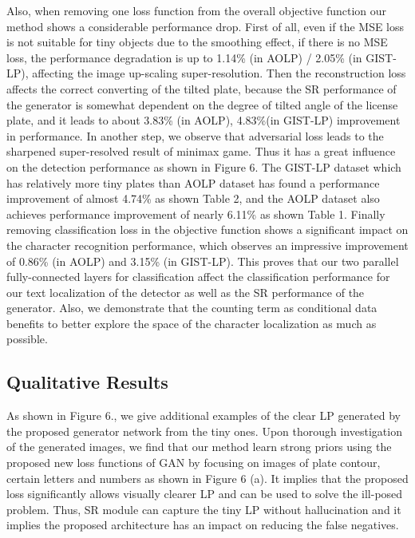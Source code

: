 \documentclass[a4paper,twoside]{article}
\begin{document}
    Also, when removing one loss function from the overall objective function our method shows a considerable performance drop. First of all, even if the MSE loss is not suitable for tiny objects due to the smoothing effect, if there is no MSE loss, the performance degradation is up to 1.14\% (in AOLP) / 2.05\% (in GIST-LP), affecting the image up-scaling super-resolution. Then the reconstruction loss affects the correct converting of the tilted plate, because the SR performance of the generator is somewhat dependent on the degree of tilted angle of the license plate, and it leads to about 3.83\% (in AOLP), 4.83\%(in GIST-LP) improvement in performance. In another step, we observe that adversarial loss leads to the sharpened super-resolved result of minimax game. Thus it has a great influence on the detection performance as shown in Figure 6. The GIST-LP dataset which has relatively more tiny plates than AOLP dataset has found a performance improvement of almost 4.74\% as shown Table 2, and the AOLP dataset also achieves performance improvement of nearly 6.11\% as shown Table 1. Finally removing classification loss in the objective function shows a significant impact on the character recognition performance, which observes an impressive improvement of 0.86\% (in AOLP) and 3.15\% (in GIST-LP). This proves that our two parallel fully-connected layers for classification affect the classification performance for our text localization of the detector as well as the SR performance of the generator. Also, we demonstrate that the counting term as conditional data benefits to better explore the space of the character localization as much as possible.
    
\subsection{Qualitative Results} 
As shown in Figure 6., we give additional examples of the clear LP generated by the proposed generator network from the tiny ones. Upon thorough investigation of the generated images, we find that our method learn strong priors using the proposed new loss functions of GAN by focusing on images of plate contour, certain letters and numbers as shown in Figure 6 (a). It implies that the proposed loss significantly allows visually clearer LP and can be used to solve the ill-posed problem. Thus, SR module can capture the tiny LP without hallucination and it implies the proposed architecture has an impact on reducing the false negatives.
\end{document}
